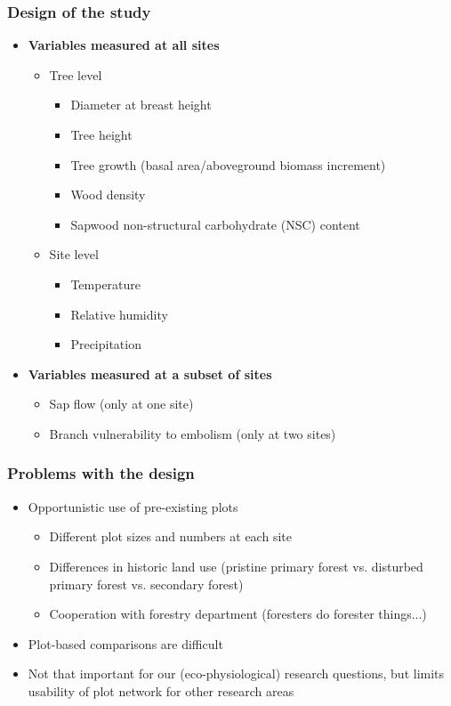 \documentclass[usepdftitle=false]{beamer}
\newcommand{\Blue}[1]{{\color{blue!50!black}\textbf{#1}}}
\newcommand{\rar}{$\rightarrow$}
\newcommand{\Rar}{$\Rightarrow$}
\begin{document}
\begin{frame}
	\frametitle{Design of the study}
	\begin{itemize}
		\item \Blue{Variables measured at all sites}
		\begin{itemize}
			\item \alert<1>{Tree level}
			\begin{itemize}
				\item Diameter at breast height
				\item Tree height
				\item Tree growth (basal area/aboveground biomass increment)
				\item Wood density
				\item Sapwood non-structural carbohydrate (NSC) content
			\end{itemize}
			 \item  \alert<1>{Site level}
			  \begin{itemize}
			  	\item Temperature
			  	\item Relative humidity 
			  	\item Precipitation
			  \end{itemize}
		\end{itemize}		
		\item<2> \Blue{Variables measured at a subset of sites}
		\begin{itemize}
			\item  \alert<2>{Sap flow} (only at one site)
			\item  \alert<2>{Branch vulnerability to embolism} (only at two sites)
		\end{itemize}
	\end{itemize}
\end{frame}

\begin{frame}
	\frametitle{Problems with the design}
	\begin{itemize}
		\item<+-> \alert<1>{Opportunistic use of pre-existing plots}
		\begin{itemize}
			\item<+-| alert@+> Different plot sizes and numbers at each site
			\item<+-| alert@+> Differences in historic land use (pristine primary forest vs. disturbed primary forest vs. secondary forest)
			\item<+-| alert@+> Cooperation with forestry department (foresters do forester things...)
		\end{itemize}	
		\item<visible@+-| alert@+>[\rar] Plot-based comparisons are difficult
		\item<visible@+-| alert@+>[\Rar] Not that important for our (eco-physiological) research questions, but limits usability of plot network for other research areas
	\end{itemize}
\end{frame}
\end{document}
